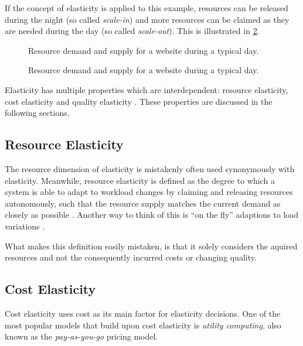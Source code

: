 If the concept of elasticity is applied to this example, resources can be released during the night (so called \textit{scale-in}) and more resources can be claimed as they are needed during the day (so called \textit{scale-out}). This is illustrated in \cref{fig:elasticity-application-scaling}.

\begin{figure}[ht]
    \centering
    
    \caption{Resource demand and supply for a website during a typical day.}
    \label{fig:elasticity-application-no-scaling}
\end{figure}

\begin{figure}[ht]
    \centering
    
    \caption{Resource demand and supply for a website during a typical day.}
    \label{fig:elasticity-application-scaling}
\end{figure}

Elasticity has multiple properties which are interdependent: resource elasticity, cost elasticity and quality elasticity \cite{dustdarPrinciplesElasticProcesses2011}. These properties are discussed in the following sections.

\subsection{Resource Elasticity}

The resource dimension of elasticity is mistakenly often used synonymously with elasticity. Meanwhile, resource elasticity is defined as the degree to which a system is able to adapt to workload changes by claiming and releasing resources autonomously, such that the resource supply matches the current demand as closely as possible \cite{herbstElasticityCloudComputing2013}. Another way to think of this is ``on the fly'' adaptions to load variations \cite{al-dhuraibiElasticityCloudComputing2018}.

What makes this definition easily mistaken, is that it solely considers the aquired resources and not the consequently incurred costs or changing quality.

\subsection{Cost Elasticity}

Cost elasticity uses cost as its main factor for elasticity decisions. One of the most popular models that build upon cost elasticity is \textit{utility computing}, also known as the \textit{pay-as-you-go} pricing model.

